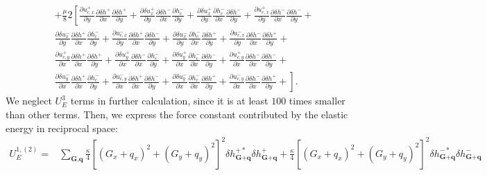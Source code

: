 \documentclass[aps,prx,10pt,twocolumn,superscriptaddress]{revtex4}
\begin{document}
\begin{widetext}
\begin{align}
&+\frac{\mu}{8}2\left[  \frac{\partial u^{+}_{c,x}}{\partial y}  \frac{\partial \delta h^{+}}{\partial x}\frac{\partial \delta h^{+}}{\partial y} +  \frac{\partial \delta u^{+}_{x}}{\partial y}  \frac{\partial \delta h^{-}}{\partial x}\frac{\partial h^{-}_{c}}{\partial y}  +  \frac{\partial \delta u^{+}_{x}}{\partial y}  \frac{\partial h^{-}_{c}}{\partial x}\frac{\partial \delta h^{-}}{\partial y} +  \frac{\partial u^{+}_{c,x}}{\partial y}  \frac{\partial \delta h^{-}}{\partial x}\frac{\partial \delta h^{-}}{\partial y}+ \right.\nonumber \\
&\left.  \frac{\partial \delta u^{-}_{x}}{\partial y}  \frac{\partial \delta h^{+}}{\partial x}\frac{\partial h^{-}_{c}}{\partial y} +  \frac{\partial u^{-}_{c,x}}{\partial y}  \frac{\partial \delta h^{+}}{\partial x}\frac{\partial \delta h^{-}}{\partial y}  +  \frac{\partial \delta u^{-}_{x}}{\partial y}  \frac{\partial h^{-}_{c}}{\partial x}\frac{\partial \delta h^{+}}{\partial y} +  \frac{\partial u^{-}_{c,x}}{\partial y}  \frac{\partial \delta h^{-}}{\partial x}\frac{\partial \delta h^{+}}{\partial y}+  \right.\nonumber\\
&\left.  \frac{\partial u^{+}_{c,y}}{\partial x}  \frac{\partial \delta h^{+}}{\partial x}\frac{\partial \delta h^{+}}{\partial y} +  \frac{\partial \delta u^{+}_{y}}{\partial x}  \frac{\partial \delta h^{-}}{\partial x}\frac{\partial h^{-}_{c}}{\partial y}  +  \frac{\partial \delta u^{+}_{y}}{\partial x}  \frac{\partial h^{-}_{c}}{\partial x}\frac{\partial \delta h^{-}}{\partial y} +  \frac{\partial u^{+}_{c,y}}{\partial x}  \frac{\partial \delta h^{-}}{\partial x}\frac{\partial \delta h^{-}}{\partial y}+ \right. \nonumber\\
&\left.  \frac{\partial \delta u^{-}_{y}}{\partial x}  \frac{\partial \delta h^{+}}{\partial x}\frac{\partial h^{-}_{c}}{\partial y} +  \frac{\partial u^{-}_{c,y}}{\partial x}  \frac{\partial \delta h^{+}}{\partial x}\frac{\partial \delta h^{-}}{\partial y}  +  \frac{\partial \delta u^{-}_{y}}{\partial x}  \frac{\partial h^{-}_{c}}{\partial x}\frac{\partial \delta h^{+}}{\partial y} +  \frac{\partial u^{-}_{c,y}}{\partial x}  \frac{\partial \delta h^{-}}{\partial x}\frac{\partial \delta h^{+}}{\partial y}+  \right].
\end{align}
We neglect $U^{3}_{E}$ terms in further calculation, since it is at least $100$ times smaller than other terms. 
Then, we express the force constant contributed by the elastic energy in reciprocal space:
\allowdisplaybreaks
\begin{align}
U^{1,(2)}_{E}=&\sum_{\textbf{G},\textbf{q}}\frac{\kappa}{4}[(G_{x}+q_{x})^{2}+(G_{y}+q_{y})^{2}]^{2}\delta h^{+*}_{\textbf{G}+\textbf{q}}\delta h^{+}_{\textbf{G}+\textbf{q}}+\frac{\kappa}{4}[(G_{x}+q_{x})^{2}+(G_{y}+q_{y})^{2}]^{2}\delta h^{-*}_{\textbf{G}+\textbf{q}}\delta h^{-}_{\textbf{G}+\textbf{q}}\nonumber\\

\end{align}
\end{widetext}
\end{document}
